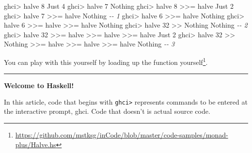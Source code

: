 \documentclass[]{article}
\newenvironment{Shaded}{}{}
\newcommand{\CommentTok}[1]{\textcolor[rgb]{0.38,0.63,0.69}{\textit{#1}}}
\newcommand{\DataTypeTok}[1]{\textcolor[rgb]{0.56,0.13,0.00}{#1}}
\newcommand{\DecValTok}[1]{\textcolor[rgb]{0.25,0.63,0.44}{#1}}
\newcommand{\NormalTok}[1]{#1}
\newcommand{\OperatorTok}[1]{\textcolor[rgb]{0.40,0.40,0.40}{#1}}
\renewcommand{\href}[2]{#2\footnote{\url{#1}}}
\begin{document}
\begin{Shaded}
\begin{Highlighting}[]
\NormalTok{ghci}\OperatorTok{\textgreater{}}\NormalTok{ halve }\DecValTok{8}
\DataTypeTok{Just} \DecValTok{4}
\NormalTok{ghci}\OperatorTok{\textgreater{}}\NormalTok{ halve }\DecValTok{7}
\DataTypeTok{Nothing}
\NormalTok{ghci}\OperatorTok{\textgreater{}}\NormalTok{ halve }\DecValTok{8} \OperatorTok{\textgreater{}\textgreater{}=}\NormalTok{ halve}
\DataTypeTok{Just} \DecValTok{2}
\NormalTok{ghci}\OperatorTok{\textgreater{}}\NormalTok{ halve }\DecValTok{7} \OperatorTok{\textgreater{}\textgreater{}=}\NormalTok{ halve}
\DataTypeTok{Nothing}                         \CommentTok{{-}{-} 1}
\NormalTok{ghci}\OperatorTok{\textgreater{}}\NormalTok{ halve }\DecValTok{6} \OperatorTok{\textgreater{}\textgreater{}=}\NormalTok{ halve}
\DataTypeTok{Nothing}
\NormalTok{ghci}\OperatorTok{\textgreater{}}\NormalTok{ halve }\DecValTok{6} \OperatorTok{\textgreater{}\textgreater{}=}\NormalTok{ halve }\OperatorTok{\textgreater{}\textgreater{}=}\NormalTok{ halve}
\DataTypeTok{Nothing}
\NormalTok{ghci}\OperatorTok{\textgreater{}}\NormalTok{ halve }\DecValTok{32} \OperatorTok{\textgreater{}\textgreater{}} \DataTypeTok{Nothing}
\DataTypeTok{Nothing}                         \CommentTok{{-}{-} 2}
\NormalTok{ghci}\OperatorTok{\textgreater{}}\NormalTok{ halve }\DecValTok{32} \OperatorTok{\textgreater{}\textgreater{}=}\NormalTok{ halve }\OperatorTok{\textgreater{}\textgreater{}=}\NormalTok{ halve }\OperatorTok{\textgreater{}\textgreater{}=}\NormalTok{ halve}
\DataTypeTok{Just} \DecValTok{2}
\NormalTok{ghci}\OperatorTok{\textgreater{}}\NormalTok{ halve }\DecValTok{32} \OperatorTok{\textgreater{}\textgreater{}} \DataTypeTok{Nothing} \OperatorTok{\textgreater{}\textgreater{}=}\NormalTok{ halve }\OperatorTok{\textgreater{}\textgreater{}=}\NormalTok{ halve }\OperatorTok{\textgreater{}\textgreater{}=}\NormalTok{ halve}
\DataTypeTok{Nothing}                         \CommentTok{{-}{-} 3}
\end{Highlighting}
\end{Shaded}

You can play with this yourself by
\href{https://github.com/mstksg/inCode/blob/master/code-samples/monad-plus/Halve.hs}{loading
up the function yourself}.

\begin{center}\rule{0.5\linewidth}{0.5pt}\end{center}

\textbf{Welcome to Haskell!}

In this article, code that begins with \texttt{ghci\textgreater{}} represents
commands to be entered at the interactive prompt, ghci. Code that doesn't is
actual source code.
\end{document}
